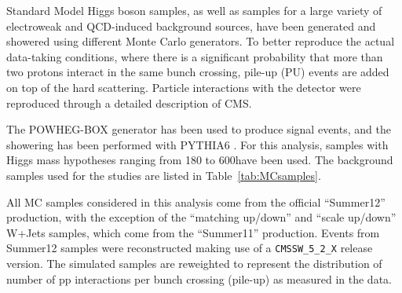 Standard Model Higgs boson samples, 
as well as samples for a large variety of electroweak and QCD-induced background sources, 
have been generated and showered using different Monte Carlo generators.
To better reproduce the actual data-taking conditions, where there is a significant probability
that more than two protons interact in the same bunch crossing, pile-up (PU) events are
added on top of the hard scattering. Particle interactions with the detector were reproduced through
a detailed description of CMS.

The POWHEG-BOX generator
\cite{Nason:2004rx,Frixione:2007vw,Alioli:2010xd,Nason:2009ai} has
been used to produce signal events, and the showering has been
performed with PYTHIA6 \cite{pythia}. For this analysis, samples with
Higgs mass hypotheses ranging from 180 to 600\GeVcc have been
used.
The background samples used for the studies are listed in
Table~\ref{tab:MCsamples}.

All MC samples considered in this analysis come from the official
``Summer12'' production, with the exception of the ``matching up/down'' and
``scale up/down'' W+Jets samples, which come from the ``Summer11''
production.  Events from Summer12 samples were reconstructed making
use of a \texttt{CMSSW\_5\_2\_X} release version.  
The simulated samples are reweighted to represent the
distribution of number of pp interactions per bunch crossing (pile-up)
as measured in the data.


